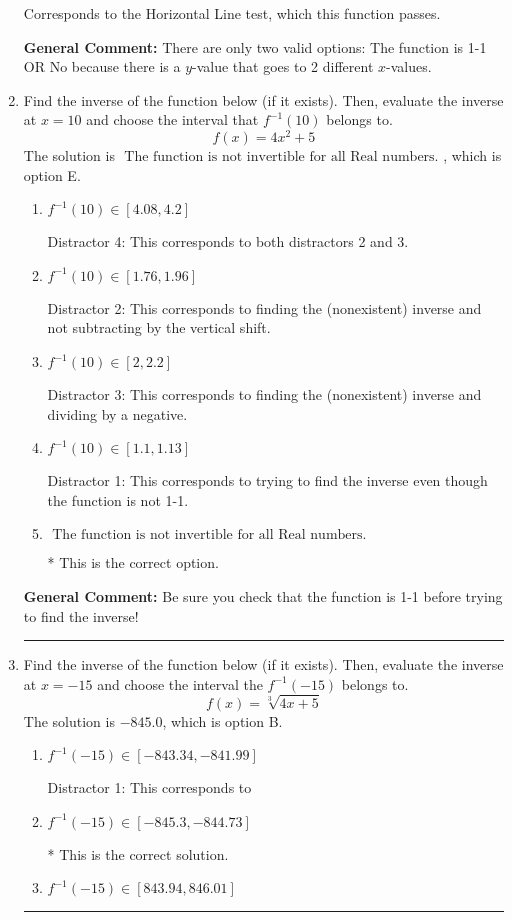 \documentclass{extbook}[14pt]
\newcommand{\litem}[1]{\item #1

\rule{\textwidth}{0.4pt}}
\begin{document}
\begin{enumerate}
{\begin{enumerate}[label=\Alph*.]
Corresponds to the Horizontal Line test, which this function passes.
\end{enumerate}

\textbf{General Comment:} There are only two valid options: The function is 1-1 OR No because there is a $y$-value that goes to 2 different $x$-values.
}
\litem{
Find the inverse of the function below (if it exists). Then, evaluate the inverse at $x = 10$ and choose the interval that $f^{-1}(10)$ belongs to.
\[ f(x) = 4 x^2 + 5 \]The solution is \( \text{ The function is not invertible for all Real numbers. } \), which is option E.\begin{enumerate}[label=\Alph*.]
\item \( f^{-1}(10) \in [4.08, 4.2] \)

 Distractor 4: This corresponds to both distractors 2 and 3.
\item \( f^{-1}(10) \in [1.76, 1.96] \)

 Distractor 2: This corresponds to finding the (nonexistent) inverse and not subtracting by the vertical shift.
\item \( f^{-1}(10) \in [2, 2.2] \)

 Distractor 3: This corresponds to finding the (nonexistent) inverse and dividing by a negative.
\item \( f^{-1}(10) \in [1.1, 1.13] \)

 Distractor 1: This corresponds to trying to find the inverse even though the function is not 1-1. 
\item \( \text{ The function is not invertible for all Real numbers. } \)

* This is the correct option.
\end{enumerate}

\textbf{General Comment:} Be sure you check that the function is 1-1 before trying to find the inverse!
}
\litem{
Find the inverse of the function below (if it exists). Then, evaluate the inverse at $x = -15$ and choose the interval the $f^{-1}(-15)$ belongs to.
\[ f(x) = \sqrt[3]{4 x + 5} \]The solution is \( -845.0 \), which is option B.\begin{enumerate}[label=\Alph*.]
\item \( f^{-1}(-15) \in [-843.34, -841.99] \)

 Distractor 1: This corresponds to 
\item \( f^{-1}(-15) \in [-845.3, -844.73] \)

* This is the correct solution.
\item \( f^{-1}(-15) \in [843.94, 846.01] \)


\end{enumerate}}
\end{enumerate}
\end{document}
